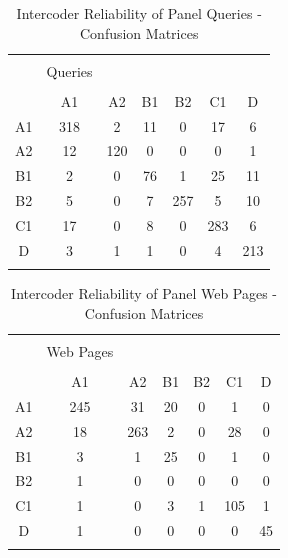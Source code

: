 \documentclass[12pt]{article}
\begin{document}
\begin{table}[!htbp] \centering 
  \caption{Intercoder Reliability of Panel Queries - Confusion Matrices} 
  \label{intercoder_queries} 
\begin{tabular}{@{\extracolsep{5pt}} ccccccc} 
\\[-1.8ex]\hline 
\hline \\[-1.8ex] 
 &   Queries & &&&& \\ 
\hline \\[-1.8ex] 
      &   A1 & A2 & B1 & B2 & C1 &  D \\
  A1 &   318 &  2 & 11 &  0 & 17 &  6\\
  A2    & 12 &120 &  0  & 0   &0 &  1\\
  B1     & 2  & 0 & 76 &  1 & 25 & 11\\
  B2    & 5  & 0 &  7& 257  & 5 & 10\\
  C1     &17  & 0 &  8  & 0& 283 &  6\\
  D     & 3 &  1 &  1 &  0 &  4& 213\\
\hline \\[-1.8ex] 
\end{tabular} 
\end{table} 

\clearpage

\begin{table}[!htbp] \centering 
  \caption{Intercoder Reliability of Panel Web Pages - Confusion Matrices} 
  \label{intercoder_webpages} 
\begin{tabular}{@{\extracolsep{5pt}} ccccccc} 
\\[-1.8ex]\hline 
\hline \\[-1.8ex] 
 &   Web Pages & &&&& \\ 
\hline \\[-1.8ex] 
      & A1 & A2 & B1 &B2 & C1 & D \\
A1 &  245&31&20& 0& 1& 0 \\
A2 &  18 & 263& 2& 0&28& 0 \\
B1 &  3& 1&25& 0& 1& 0 \\
B2 &  1& 0& 0& 0& 0& 0 \\
C1 &  1& 0& 3& 1 & 105& 1 \\
D  & 1& 0& 0& 0& 0&45 \\
\hline \\[-1.8ex] 
\end{tabular} 
\end{table} 
\end{document}
